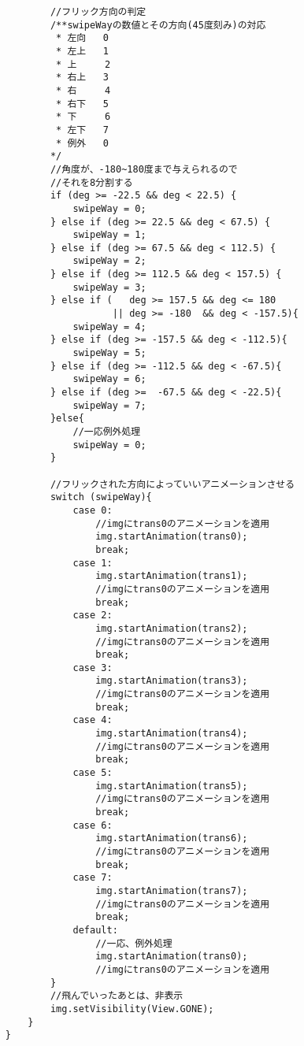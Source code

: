 \documentclass[11pt,a4j]{jarticle}
\begin{document}
\begin{verbatim}
            //フリック方向の判定
            /**swipeWayの数値とその方向(45度刻み)の対応
             * 左向   0
             * 左上   1
             * 上     2
             * 右上   3
             * 右     4
             * 右下   5
             * 下     6
             * 左下   7
             * 例外   0
            */
            //角度が、-180~180度まで与えられるので
            //それを8分割する
            if (deg >= -22.5 && deg < 22.5) {
                swipeWay = 0;
            } else if (deg >= 22.5 && deg < 67.5) {
                swipeWay = 1;
            } else if (deg >= 67.5 && deg < 112.5) {
                swipeWay = 2;
            } else if (deg >= 112.5 && deg < 157.5) {
                swipeWay = 3;
            } else if (   deg >= 157.5 && deg <= 180
                       || deg >= -180  && deg < -157.5){
                swipeWay = 4;
            } else if (deg >= -157.5 && deg < -112.5){
                swipeWay = 5;
            } else if (deg >= -112.5 && deg < -67.5){
                swipeWay = 6;
            } else if (deg >=  -67.5 && deg < -22.5){
                swipeWay = 7;
            }else{
                //一応例外処理
                swipeWay = 0;
            }

            //フリックされた方向によっていいアニメーションさせる
            switch (swipeWay){
                case 0:
                    //imgにtrans0のアニメーションを適用
                    img.startAnimation(trans0);
                    break;
                case 1:
                    img.startAnimation(trans1);
                    //imgにtrans0のアニメーションを適用
                    break;
                case 2:
                    img.startAnimation(trans2);
                    //imgにtrans0のアニメーションを適用
                    break;
                case 3:
                    img.startAnimation(trans3);
                    //imgにtrans0のアニメーションを適用
                    break;
                case 4:
                    img.startAnimation(trans4);
                    //imgにtrans0のアニメーションを適用
                    break;
                case 5:
                    img.startAnimation(trans5);
                    //imgにtrans0のアニメーションを適用
                    break;
                case 6:
                    img.startAnimation(trans6);
                    //imgにtrans0のアニメーションを適用
                    break;
                case 7:
                    img.startAnimation(trans7);
                    //imgにtrans0のアニメーションを適用
                    break;
                default:
                    //一応、例外処理
                    img.startAnimation(trans0);
                    //imgにtrans0のアニメーションを適用
            }
            //飛んでいったあとは、非表示
            img.setVisibility(View.GONE);
        }
    }


\end{verbatim}
\end{document}
